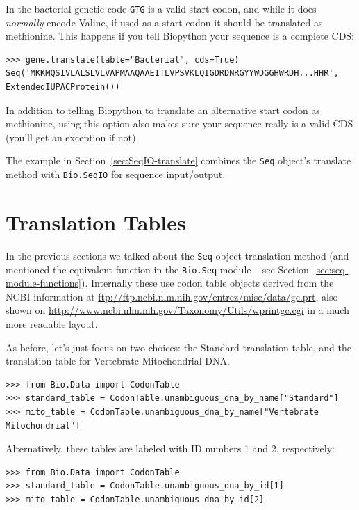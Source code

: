 \documentclass{report}
\begin{document}
\noindent In the bacterial genetic code \texttt{GTG} is a valid start codon,
and while it does \emph{normally} encode Valine, if used as a start codon it
should be translated as methionine. This happens if you tell Biopython your
sequence is a complete CDS:

\begin{verbatim}
>>> gene.translate(table="Bacterial", cds=True)
Seq('MKKMQSIVLALSLVLVAPMAAQAAEITLVPSVKLQIGDRDNRGYYWDGGHWRDH...HHR',
ExtendedIUPACProtein())
\end{verbatim}

In addition to telling Biopython to translate an alternative start codon as
methionine, using this option also makes sure your sequence really is a valid
CDS (you'll get an exception if not).

The example in Section~\ref{sec:SeqIO-translate} combines the \verb|Seq| object's
translate method with \verb|Bio.SeqIO| for sequence input/output.

\section{Translation Tables}

In the previous sections we talked about the \verb|Seq| object translation method (and mentioned the equivalent function in the \verb|Bio.Seq| module -- see
Section~\ref{sec:seq-module-functions}).
Internally these use codon table objects derived from the NCBI information at
\url{ftp://ftp.ncbi.nlm.nih.gov/entrez/misc/data/gc.prt}, also shown on
\url{http://www.ncbi.nlm.nih.gov/Taxonomy/Utils/wprintgc.cgi} in a much more readable layout.

As before, let's just focus on two choices: the Standard translation table, and the
translation table for Vertebrate Mitochondrial DNA. 

\begin{verbatim}
>>> from Bio.Data import CodonTable
>>> standard_table = CodonTable.unambiguous_dna_by_name["Standard"]
>>> mito_table = CodonTable.unambiguous_dna_by_name["Vertebrate Mitochondrial"]
\end{verbatim}

Alternatively, these tables are labeled with ID numbers 1 and 2, respectively:
\begin{verbatim}
>>> from Bio.Data import CodonTable
>>> standard_table = CodonTable.unambiguous_dna_by_id[1]
>>> mito_table = CodonTable.unambiguous_dna_by_id[2]
\end{verbatim}
\end{document}
